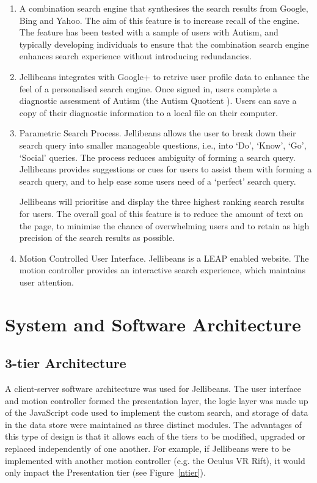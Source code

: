 \documentclass[a4paper, 11pt]{article}
\begin{document}
\begin{enumerate}
\item{}
A combination search engine that synthesises the search results from Google, Bing and Yahoo. The aim of this feature is to increase recall of the engine. The feature has been tested with a sample of users with Autism, and typically developing individuals to ensure that the combination search engine enhances search experience without introducing redundancies. 

\item{}
Jellibeans integrates with Google+ to retrive user profile data to enhance the feel of a personalised search engine. Once signed in, users complete a diagnostic assessment of Autism (the Autism Quotient \cite{Baron Cohen et al}). Users can save a copy of their diagnostic information to a local file on their computer.

\item{Parametric Search Process.}
Jellibeans allows the user to break down their search query into smaller manageable questions, i.e., into `Do', `Know', `Go', `Social' queries. The process reduces ambiguity of forming a search query. Jellibeans provides suggestions or cues for users to assist them with forming a search query, and to help ease some users need of a `perfect' search query.

\vspace{1mm}
Jellibeans will prioritise and display the three highest ranking search results for users. The overall goal of this feature is to reduce the amount of text on the page, to minimise the chance of overwhelming users and to retain as high precision of the search results as possible.

\item{Motion Controlled User Interface.}
Jellibeans is a LEAP enabled website. The motion controller provides an interactive search experience, which maintains user attention.

\end{enumerate}





\section{System and Software Architecture}

\subsection{3-tier Architecture}
A client-server software architecture was used for Jellibeans. The user interface and motion controller formed the presentation layer, the logic layer was made up of the JavaScript code used to implement the custom search, and storage of data in the data store were maintained as three distinct modules. The advantages of this type of design is that it allows each of the tiers to be modified, upgraded or replaced independently of one another. For example, if Jellibeans were to be implemented with another motion controller (e.g. the Oculus VR Rift), it would only impact the Presentation tier (see Figure~\ref{ntier}).
\end{document}
